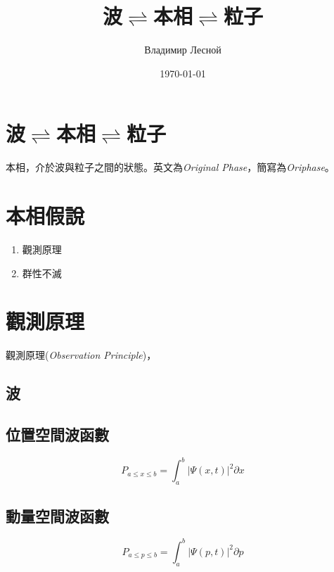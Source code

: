 \documentclass[a4paper,notitlepage,UTF8]{ctexart}
\title{波$\rightleftharpoons$本相$\rightleftharpoons$粒子}
\author{Владимир Лесной}
\date{\today}
\begin{document}
  \maketitle


\section{波$\rightleftharpoons$本相$\rightleftharpoons$粒子}

本相，介於波與粒子之間的狀態。英文為{\it Original Phase}，簡寫為{\it Oriphase}。

\section{本相假說}

\begin{enumerate}
\item{觀測原理}
\item{群性不滅}
\end{enumerate}

\section{觀測原理}

觀測原理({\it Observation Principle})，

\subsection{波}


\subsection{位置空間波函數}

\begin{equation}
P_{a \leq x \leq b} = \int_{a}^{b} |\Psi(x,t)|^2 \partial{x}
\end{equation}


\subsection{動量空間波函數}


\begin{equation}
P_{a \leq p \leq b} = \int_{a}^{b} |\Psi(p,t)|^2 \partial{p}
\end{equation}
\end{document}
